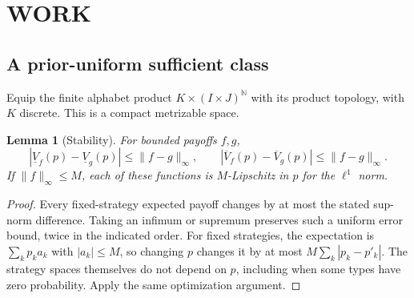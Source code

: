\documentclass[11pt,a4paper]{article}
\newtheorem{lemma}[theorem]{Lemma}
\theoremstyle{definition}
\theoremstyle{remark}
\begin{document}
\section{WORK}
\subsection{A prior-uniform sufficient class}
Equip the finite alphabet product $K\times(I\times J)^{\mathbb N}$ with its product topology, with $K$ discrete. This is a compact metrizable space.

\begin{lemma}[Stability]
For bounded payoffs $f,g$,
\[
 |\underline V_f(p)-\underline V_g(p)|\leq\|f-g\|_\infty,
 \qquad
 |\overline V_f(p)-\overline V_g(p)|\leq\|f-g\|_\infty.
\]
If $\|f\|_\infty\leq M$, each of these functions is $M$-Lipschitz in $p$ for the $\ell^1$ norm.
\end{lemma}
\begin{proof}
Every fixed-strategy expected payoff changes by at most the stated sup-norm difference. Taking an infimum or supremum preserves such a uniform error bound, twice in the indicated order. For fixed strategies, the expectation is $\sum_kp_k a_k$ with $|a_k|\leq M$, so changing $p$ changes it by at most $M\sum_k|p_k-p'_k|$. The strategy spaces themselves do not depend on $p$, including when some types have zero probability. Apply the same optimization argument.
\end{proof}
\end{document}
